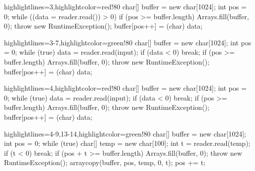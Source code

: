 \documentclass{article}
\begin{document}
\newpage
{}
\begin{snippet}
\begin{ffcode*}{highlightlines={3},highlightcolor=red!80}
char[] buffer = new char[1024];
int pos = 0;
while ((data = reader.read()) > 0) {
  if (pos >= buffer.length) {
    Arrays.fill(buffer, 0);
    throw new RuntimeException();
  }
  buffer[pos++] = (char) data;
}
\end{ffcode*}
\columnbreak
\begin{ffcode*}{highlightlines={3-7},highlightcolor=green!80}
char[] buffer = new char[1024];
int pos = 0;
while (true) {
  data = reader.read(input);
  if (data < 0) {
    break;
  }
  if (pos >= buffer.length) {
    Arrays.fill(buffer, 0);
    throw new RuntimeException();
  }
  buffer[pos++] = (char) data;
}
\end{ffcode*}
\end{snippet}

\newpage
{}
\begin{snippet}
\begin{ffcode*}{highlightlines={4},highlightcolor=red!80}
char[] buffer = new char[1024];
int pos = 0;
while (true) {
  data = reader.read(input);
  if (data < 0) {
    break;
  }
  if (pos >= buffer.length) {
    Arrays.fill(buffer, 0);
    throw new RuntimeException();
  }
  buffer[pos++] = (char) data;
}
\end{ffcode*}
\columnbreak
\begin{ffcode*}{highlightlines={4-9,13-14},highlightcolor=green!80}
char[] buffer = new char[1024];
int pos = 0;
while (true) {
  char[] temp = new char[100];
  int t = reader.read(temp);
  if (t < 0) {
    break;
  }
  if (pos + t >= buffer.length) {
    Arrays.fill(buffer, 0);
    throw new RuntimeException();
  }
  arraycopy(buffer, pos, temp, 0, t);
  pos += t;
}
\end{ffcode*}
\end{snippet}


\end{document}
